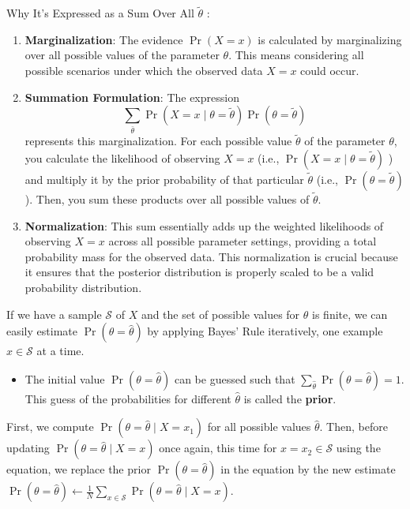\documentclass[9pt,dvipsnames]{beamer}
\begin{document}
\begin{frame}{Why It's Expressed as a Sum Over All $\tilde{\theta}$ :}
	\begin{enumerate}
		\item \textbf{Marginalization}: The evidence $\operatorname{Pr}(X=x)$ is calculated by marginalizing over all possible values of the parameter $\theta$. This means considering all possible scenarios under which the observed data $X=x$ could occur.
		\item \textbf{Summation Formulation}: The expression
		$$
		\sum_{\bar{\theta}} \operatorname{Pr}(X=x \mid \theta=\tilde{\theta}) \operatorname{Pr}(\theta=\tilde{\theta})
		$$
		represents this marginalization. For each possible value $\tilde{\theta}$ of the parameter $\theta$, you calculate the likelihood of observing $X=x$ (i.e., $\operatorname{Pr}(X=x \mid \theta=\tilde{\theta})$ ) and multiply it by the prior probability of that particular $\tilde{\theta}$ (i.e., $\operatorname{Pr}(\theta=\tilde{\theta})$ ). Then, you sum these products over all possible values of $\tilde{\theta}$.
		\item \textbf{Normalization}: This sum essentially adds up the weighted likelihoods of observing $X=x$ across all possible parameter settings, providing a total probability mass for the observed data. This normalization is crucial because it ensures that the posterior distribution is properly scaled to be a valid probability distribution.
	\end{enumerate}
\end{frame}
\begin{frame}
		If we have a sample $\mathcal{S}$ of $X$ and the set of possible values for $\theta$ is finite, we can easily estimate $\operatorname{Pr}(\theta=\hat{\theta})$ by applying Bayes' Rule iteratively, one example $x \in \mathcal{S}$ at a time. 
	\begin{itemize}
		\item The initial value $\operatorname{Pr}(\theta=\hat{\theta})$ can be guessed such that $\sum_{\hat{\theta}} \operatorname{Pr}(\theta=\hat{\theta})=1$. This guess of the probabilities for different $\hat{\theta}$ is called the \textbf{prior}.
	\end{itemize}
	First, we compute $\operatorname{Pr}(\theta=\hat{\theta} \mid X=x_{1})$ for all possible values $\hat{\theta}$. Then, before updating $\operatorname{Pr}(\theta=\hat{\theta} \mid X=x)$ once again, this time for $x=x_{2} \in \mathcal{S}$ using the equation, we replace the prior $\operatorname{Pr}(\theta=\hat{\theta})$ in the equation by the new estimate $\operatorname{Pr}(\theta=\hat{\theta}) \leftarrow \frac{1}{N} \sum_{x \in \mathcal{S}} \operatorname{Pr}(\theta=\hat{\theta} \mid X=x)$.
\end{frame}
\end{document}
